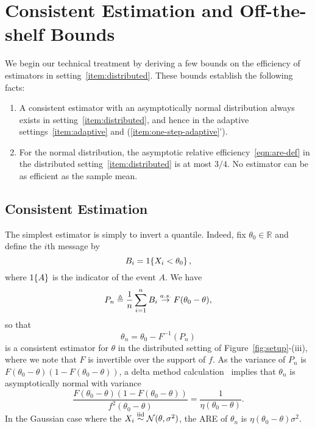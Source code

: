 \section{Consistent Estimation and Off-the-shelf Bounds \label{sec:preliminary}}

We begin our technical treatment by deriving a few
bounds on the efficiency of estimators in
setting~\eqref{item:distributed}. These bounds establish the
following facts:
\begin{enumerate}[1.]
\item A consistent estimator with an asymptotically normal distribution
  always exists in setting~\eqref{item:distributed}, and hence in the
  adaptive settings~\eqref{item:adaptive} and
  (\ref{item:one-step-adaptive}').
\item For the normal distribution, the asymptotic relative
  efficiency~\eqref{eqn:are-def} in the distributed
  setting~\eqref{item:distributed} is at most $3/4$. No estimator can be as
  efficient as the sample mean.
\end{enumerate}

\subsection{Consistent Estimation}
The simplest estimator is simply to invert a quantile. Indeed,
fix $\theta_0 \in \mathbb R$ and define the $i$th message by 
\[
B_i = 1\!\left\{X_i<\theta_0\right\}, 
\]
where $1\!\left\{A\right\}$ is the indicator of the event $A$. We have
\[
P_n \triangleq\frac{1}{n} \sum_{i=1}^n B_i \overset{a.s.}{\rightarrow} F(\theta_0 - \theta),  
\]
so that 
\begin{equation}
\label{eq:estimator_naive}
{\theta}_n = \theta_0 - F^{-1}\left( P_n \right)
\end{equation}
is a consistent estimator for $\theta$ in the distributed setting of
Figure~\ref{fig:setup}-(iii), where we note that $F$ is invertible over the
support of $f$. As the variance of $P_n$ is
$F(\theta_0-\theta)\left(1-F(\theta_0-\theta)\right)$, a delta method
calculation~\cite[Ch.~23]{VanDerVaart98} implies that ${\theta}_n$ is
asymptotically normal with variance
\begin{equation*}
  \frac{F(\theta_0-\theta)\left(1-F(\theta_0-\theta)\right)}{f^2(\theta_0-\theta)} = \frac{1}{
\eta(\theta_0-\theta)}.
\end{equation*}
In the Gaussian case where the $X_i \stackrel{\textup{iid}}{\sim} \mathcal{N}(\theta, \sigma^2)$, the
ARE of ${\theta}_n$ is $\eta(\theta_0 - \theta)\sigma^2$.

